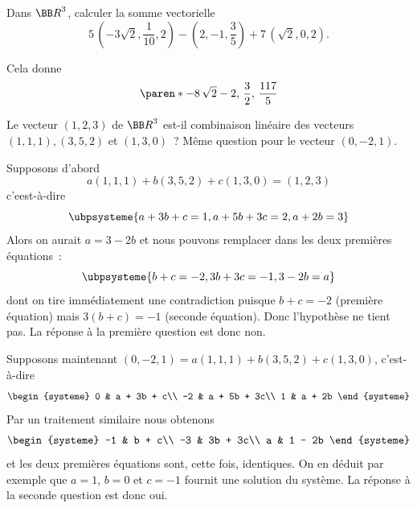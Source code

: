 \documentclass[12pt,french,oneside,a4paper]{memoir} %
\begin{document}
\begin{exo} %
Dans ${\BB R}^3$, calculer la somme vectorielle
\begin{equation*}
5\,\left(-3 \sqrt{2}, \frac{1}{10},2\right) - \left(2,-1, \frac{3}{5}\right)+7\,\left(\sqrt{2},0,2\right).
\end{equation*}

\begin{correction}
  Cela donne
  \begin{equation*}
\paren*{-8 \, \sqrt{2} - 2,\,\frac{3}{2},\,\frac{117}{5}}
  \end{equation*}
\end{correction}
\end{exo}
\begin{exo} %
Le vecteur $(1,2,3)$ de ${\BB R}^3$ est-il combinaison linéaire des 
vecteurs $(1,1,1), (3,5,2)$ et $(1,3,0)$~? Même question pour le vecteur 
$(0,-2,1)$. 

\begin{correction}
  Supposons d'abord
  \begin{equation*}
     a(1,1,1) +b (3,5,2) + c(1,3,0)  = (1,2,3)
  \end{equation*}
c'eest-à-dire
\begin{equation*}
  \ubpsysteme{a + 3b + c = 1, a + 5b + 3c = 2, a + 2b = 3}
\end{equation*}
Alors on aurait $a = 3 - 2b$ et nous pouvons remplacer dans les deux premières équations~:
\begin{equation*}
  \ubpsysteme{b + c = -2, 3b + 3c = -1, 3 - 2b = a}
\end{equation*}
dont on tire immédiatement une contradiction puisque $b+c = -2$ (première équation) mais $3(b+c) = -1$ (seconde équation). Donc l'hypothèse ne tient pas. La réponse à la première question est donc non.

Supposons maintenant $(0,-2,1) = a(1,1,1) +b (3,5,2) + c(1,3,0)$, c'est-à-dire
\begin{equation*}
  \begin{systeme}
    0 & a + 3b + c\\
    -2 & a + 5b + 3c\\
    1 & a + 2b
  \end{systeme}
\end{equation*}
Par un traitement similaire nous obtenons
\begin{equation*}
\begin{systeme}
    -1 & b + c\\
    -3 & 3b + 3c\\
    a & 1 - 2b
  \end{systeme}
\end{equation*}
et les deux premières équations sont, cette fois, identiques. On en déduit par exemple que $a = 1$, $b = 0$ et $c = -1$ fournit une solution du système. La réponse à la seconde question est donc oui.
\end{correction}
\end{exo}
\end{document}
